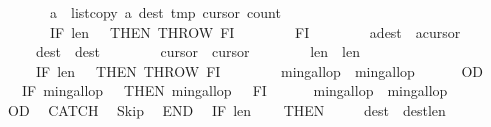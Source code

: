 \begin{isabellebody}
\ \ \ \ \ \ \ \ \ \ {\isasymacute}a\ {\isacharcolon}{\isacharequal}{\isacharequal}\ list{\isacharunderscore}copy\ {\isasymacute}a\ {\isacharparenleft}{\isasymacute}dest{\isacharplus}{}{\isacharparenright}\ {\isasymacute}tmp\ {\isacharparenleft}{\isasymacute}cursor{}{\isacharplus}{}{\isacharparenright}\ {\isasymacute}count{}{\isacharsemicolon}{\isacharsemicolon}\isanewline
\ \ \ \ \ \ \ \ \ \ IF\ {\isasymacute}len{}\ {\isasymle}\ {}\ THEN\ THROW\ FI\isanewline
\ \ \ \ \ \ \ \ FI{\isacharsemicolon}{\isacharsemicolon}\isanewline
\ \ \ \ \ \ \ \ {\isasymacute}a{\isacharbang}{\isasymacute}dest\ {\isacharcolon}{\isacharequal}{\isacharequal}\ {\isasymacute}a{\isacharbang}{\isasymacute}cursor{}{\isacharsemicolon}{\isacharsemicolon}\isanewline
\ \ \ \ \ \ \ \ {\isasymacute}dest\ {\isacharcolon}{\isacharequal}{\isacharequal}\ {\isasymacute}dest{\isacharminus}{}{\isacharsemicolon}{\isacharsemicolon}\isanewline
\ \ \ \ \ \ \ \ {\isasymacute}cursor{}\ {\isacharcolon}{\isacharequal}{\isacharequal}\ {\isasymacute}cursor{}{\isacharminus}{}{\isacharsemicolon}{\isacharsemicolon}\isanewline
\ \ \ \ \ \ \ \ {\isasymacute}len{}\ {\isacharcolon}{\isacharequal}{\isacharequal}\ {\isasymacute}len{}{\isacharminus}{}{\isacharsemicolon}{\isacharsemicolon}\isanewline
\ \ \ \ \ \ \ \ IF\ {\isasymacute}len{}\ {\isacharequal}\ {}\ THEN\ THROW\ FI{\isacharsemicolon}{\isacharsemicolon}\isanewline
\ \ \ \ \ \ \ \ {\isasymacute}min{\isacharunderscore}gallop\ {\isacharcolon}{\isacharequal}{\isacharequal}\ {\isasymacute}min{\isacharunderscore}gallop{\isacharminus}{}\isanewline
\ \ \ \ \ \ OD{\isacharsemicolon}{\isacharsemicolon}\isanewline
\ \ \ \ \ \ IF\ {\isasymacute}min{\isacharunderscore}gallop\ {\isacharless}\ {}\ THEN\ {\isasymacute}min{\isacharunderscore}gallop\ {\isacharcolon}{\isacharequal}{\isacharequal}\ {}\ FI{\isacharsemicolon}{\isacharsemicolon}\isanewline
\ \ \ \ \ \ {\isasymacute}min{\isacharunderscore}gallop\ {\isacharcolon}{\isacharequal}{\isacharequal}\ {\isasymacute}min{\isacharunderscore}gallop\ {\isacharplus}\ {}\isanewline
\ \ \ \ OD\isanewline
\ \ CATCH\isanewline
\ \ Skip\isanewline
\ \ END{\isacharsemicolon}{\isacharsemicolon}\isanewline
\ \ IF\ {\isasymacute}len{}\ {\isacharequal}\ {}\isanewline
\ \ THEN\ \isanewline
\ \ \ \ {\isasymacute}dest\ {\isacharcolon}{\isacharequal}{\isacharequal}\ {\isasymacute}dest{\isacharminus}{\isasymacute}len{}{\isacharsemicolon}{\isacharsemicolon}\isanewline

\end{isabellebody}
